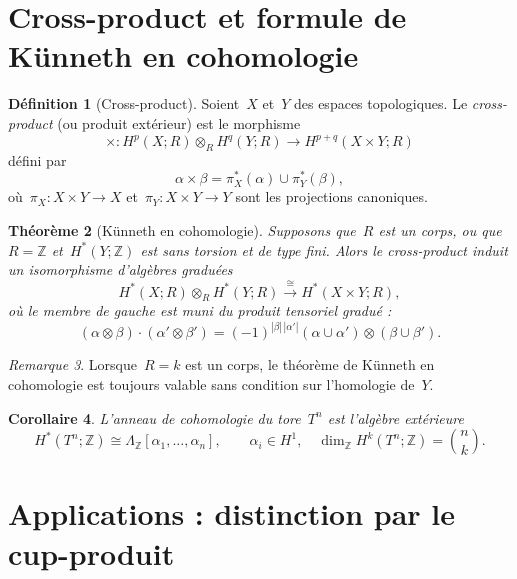 \documentclass[12pt,a4paper,openany]{book}
\theoremstyle{definition}
\newtheorem{definition}{Définition}[chapter]
\theoremstyle{plain}
\newtheorem{theoreme}[definition]{Théorème}
\newtheorem{corollaire}[definition]{Corollaire}
\theoremstyle{remark}
\newtheorem{remarque}[definition]{Remarque}
\newcommand{\Z}{\mathbb{Z}}
\begin{document}
\section{Cross-product et formule de Künneth en cohomologie}\label{sec:kunneth-cohomologie}

\begin{definition}[Cross-product]\label{def:cross-product}
Soient~$X$ et~$Y$ des espaces topologiques. Le \emph{cross-product} (ou produit
extérieur) est le morphisme
\[
  \times \colon H^p(X; R) \otimes_R H^q(Y; R) \longrightarrow H^{p+q}(X \times Y; R)
\]
défini par
\[
  \alpha \times \beta = \pi_X^*(\alpha) \cup \pi_Y^*(\beta),
\]
où~$\pi_X \colon X \times Y \to X$ et~$\pi_Y \colon X \times Y \to Y$ sont les
projections canoniques.
\end{definition}

\begin{theoreme}[Künneth en cohomologie]\label{thm:kunneth-cohomologie}
Supposons que~$R$ est un corps, ou que~$R = \Z$ et~$H^*(Y;\Z)$ est sans torsion et
de type fini. Alors le cross-product induit un isomorphisme d'algèbres graduées
\[
  H^*(X; R) \otimes_R H^*(Y; R) \xrightarrow{\;\cong\;} H^*(X \times Y; R),
\]
où le membre de gauche est muni du produit tensoriel gradué :
\[
  (\alpha \otimes \beta) \cdot (\alpha' \otimes \beta')
  = (-1)^{|\beta|\,|\alpha'|} (\alpha \cup \alpha') \otimes (\beta \cup \beta').
\]
\end{theoreme}

\begin{remarque}\label{rem:kunneth-corps}
Lorsque~$R = k$ est un corps, le théorème de Künneth en cohomologie est toujours
valable sans condition sur l'homologie de~$Y$.
\end{remarque}

\begin{corollaire}\label{cor:cohomologie-tore-n}
L'anneau de cohomologie du tore~$T^n$ est l'algèbre extérieure
\[
  H^*(T^n; \Z) \cong \Lambda_\Z[\alpha_1, \ldots, \alpha_n],
  \qquad \alpha_i \in H^1, \quad \dim_\Z H^k(T^n;\Z) = \binom{n}{k}.
\]
\end{corollaire}

\section{Applications : distinction par le cup-produit}\label{sec:distinction-cup}
\end{document}
